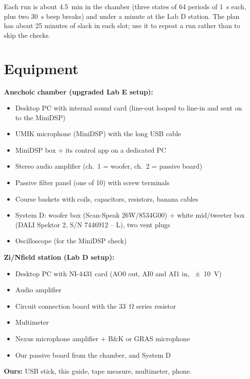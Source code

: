 \documentclass[a4paper,10pt]{article}
\begin{document}
Each run is about \SI{4.5}{min} in the chamber (three states of 64 periods of \SI{1}{s} each, plus two
\SI{30}{s} beep breaks) and under a minute at the Lab D station. The plan has about 25 minutes of slack
in each slot; use it to repeat a run rather than to skip the checks.

\section{Equipment}
{\small
\begin{minipage}[t]{0.49\textwidth}
\textbf{Anechoic chamber (upgraded Lab E setup):}
\begin{itemize}[leftmargin=12pt]
\item Desktop PC with internal sound card (line-out looped to line-in and sent on to the MiniDSP)
\item UMIK microphone (MiniDSP) with the long USB cable
\item MiniDSP box + its control app on a dedicated PC
\item Stereo audio amplifier (ch.~1 = woofer, ch.~2 = passive board)
\item Passive filter panel (one of 10) with screw terminals
\item Course baskets with coils, capacitors, resistors, banana cables
\item System D: woofer box (Scan-Speak 26W/8534G00) + white mid/tweeter box (DALI Spektor 2, S/N
  7446912 -- L), two vent plugs
\item Oscilloscope (for the MiniDSP check)
\end{itemize}
\end{minipage}\hfill
\begin{minipage}[t]{0.49\textwidth}
\textbf{Zi/Nfield station (Lab D setup):}
\begin{itemize}[leftmargin=12pt]
\item Desktop PC with NI-4431 card (AO0 out, AI0 and AI1 in, \SI{\pm 10}{V})
\item Audio amplifier
\item Circuit connection board with the \SI{33}{\ohm} series resistor
\item Multimeter
\item Nexus microphone amplifier + B\&K or GRAS microphone
\item Our passive board from the chamber, and System D
\end{itemize}
\textbf{Ours:} USB stick, this guide, tape measure, multimeter, phone.
\end{minipage}
}
\end{document}
